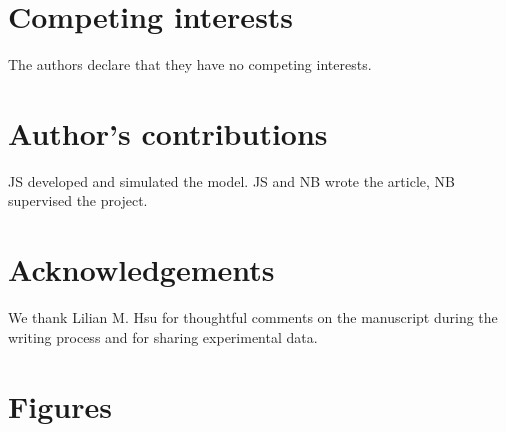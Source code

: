 \documentclass{bmcart}
\begin{document}
\begin{backmatter}

\section*{Competing interests}
  The authors declare that they have no competing interests.

\section*{Author's contributions}
   JS developed and simulated the model. JS and NB wrote the article, NB supervised the project. 

\section*{Acknowledgements}
We thank Lilian M. Hsu for thoughtful comments on the manuscript during the
writing process and for sharing experimental data.

%

\section*{Figures}


\end{backmatter}
\end{document}
